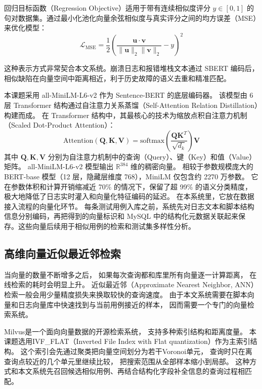 回归目标函数（Regression Objective）适用于带有连续相似度评分 $y \in [0, 1]$ 的句对数据集。通过最小化池化向量余弦相似度与真实评分之间的均方误差（MSE）来优化模型：
\begin{equation}
\label{eq:sbert_regression}
\mathcal{L}_{\text{MSE}} = \frac{1}{2} \left( \frac{\mathbf{u} \cdot \mathbf{v}}{\|\mathbf{u}\|_2 \|\mathbf{v}\|_2} - y \right)^2
\end{equation}

这种表示方式非常契合本文系统。崩溃日志和报错堆栈文本通过 SBERT 编码后，相似缺陷在向量空间中距离相近，利于历史故障的语义去重和精准匹配。

本课题采用 all-MiniLM-L6-v2\cite{ref_minilm} 作为 Sentence-BERT 的底层编码器。
该模型由 6 层 Transformer 结构通过自注意力关系蒸馏（Self-Attention Relation Distillation）构建而成。
在 Transformer 结构中，其最核心的技术为缩放点积自注意力机制（Scaled Dot-Product Attention）：
\begin{equation}
\label{eq:self_attention}
\text{Attention}(\mathbf{Q}, \mathbf{K}, \mathbf{V}) = \text{softmax}\left( \frac{\mathbf{Q} \mathbf{K}^T}{\sqrt{d_k}} \right) \mathbf{V}
\end{equation}
其中 $\mathbf{Q}, \mathbf{K}, \mathbf{V}$ 分别为自注意力机制中的查询（Query）、键（Key）和值（Value）矩阵。
all-MiniLM-L6-v2 模型输出 $\mathbb{R}^{384}$ 维的稠密向量。
相较于参数规模庞大的 BERT-base 模型（12 层，隐藏层维度 768），MiniLM 仅包含约 2270 万参数。
它在参数体积和计算开销缩减近 70\% 的情况下，保留了超 99\% 的语义分类精度，
极大地降低了日志实时灌入和向量化特征编码的延迟。
在本系统里，它放在数据接入流程的向量化环节。
每条测试用例入库之前，系统先对日志文本和脚本结构信息分别编码，再把得到的向量标识和 MySQL 中的结构化元数据关联起来保存。这些向量后续用于相似用例的检索和测试集多样性分析。

\subsection{高维向量近似最近邻检索}

当向量的数量不断增多之后，
如果每次查询都和库里所有向量逐一计算距离，
在线检索的耗时会明显上升。
近似最近邻（Approximate Nearest Neighbor, ANN）检索一般会用少量精度损失来换取较快的查询速度\cite{ref_ann_benchmark}。
由于本文系统需要在脚本向量和日志向量库中快速找到与当前用例接近的样本，
因而需要一个专门的向量检索系统。

Milvus\cite{ref_milvus_arch}是一个面向向量数据的开源检索系统，
支持多种索引结构和距离度量。
本课题选用IVF\_FLAT（Inverted File Index with Flat quantization）作为主索引结构。
这个索引会先通过聚类把向量空间划分为若干Voronoi单元，
查询时只在离查询点较近的几个单元里继续比较，
把搜索范围从全部样本缩小到局部\cite{ref_ivf}。
这种方式和本文系统先召回候选相似用例、再结合结构化字段补全信息的查询过程相匹配。

